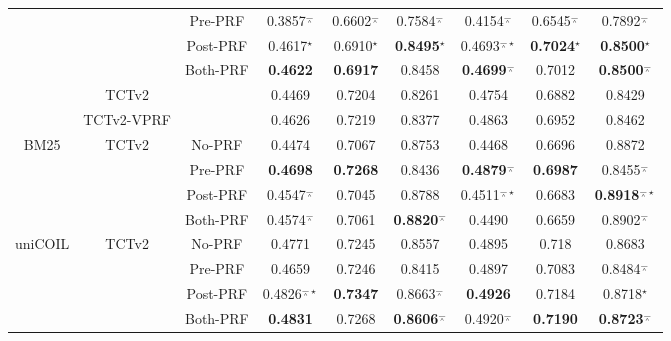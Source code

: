 \begin{table*}[]
{\begin{tabular}{ccc|ccc|ccc}
			&&Pre-PRF   &0.3857${^\barwedge}$ & 0.6602${^\barwedge}$   & 0.7584${^\barwedge}$ &  0.4154${^\barwedge}$& 0.6545${^\barwedge}$ &0.7892${^\barwedge}$         \\
			&&Post-PRF   & 0.4617${^\star}$ &  0.6910${^\star}$   &    \textbf{0.8495}${^\star}$   &    0.4693${^{\barwedge\star}}$  & \textbf{0.7024}${^\star}$  & \textbf{0.8500}${^\star}$  \\
			&&Both-PRF  &   \textbf{0.4622} & \textbf{0.6917}  &   0.8458 &    \textbf{0.4699}${^\barwedge}$ & 0.7012 &   \textbf{0.8500}${^\barwedge}$ \\
			\midrule\midrule
			&TCTv2&                   &        0.4469        &      0.7204      &        0.8261        &            0.4754             &        0.6882        &                0.8429                 \\
			&TCTv2-VPRF&               &        0.4626        &      0.7219      &        0.8377        &            0.4863             &        0.6952        &                0.8462                 \\\midrule
			\multirow{4}{*}{{BM25}}&\multirow{4}{*}{{TCTv2}}&No-PRF              &        0.4474        &      0.7067      &        0.8753        &            0.4468             &        0.6696        &                0.8872                 \\
			&&Pre-PRF        &   \textbf{0.4698}    & \textbf{0.7268}  &        0.8436        & \textbf{0.4879}${^\barwedge}$ &  \textbf{0.6987}   &         0.8455${^\barwedge}$          \\
			&&Post-PRF        & 0.4547${^\barwedge}$ &      0.7045      &        0.8788        &  0.4511${^{\barwedge\star}}$  &        0.6683        & \textbf{0.8918}${^{\barwedge\star}}$ \\
			&&Both-PRF &        0.4574${^\barwedge}$        &      0.7061      &   \textbf{0.8820}${^\barwedge}$   &            0.4490             &        0.6659        &                0.8902${^\barwedge}$                \\\midrule
			\multirow{4}{*}{{uniCOIL}}&\multirow{4}{*}{{TCTv2}}&No-PRF  & 0.4771&0.7245&0.8557&0.4895&0.718&0.8683    \\
			&&Pre-PRF  & 0.4659&0.7246&0.8415&0.4897&0.7083&0.8484${^\barwedge}$         \\
			&&Post-PRF  & 0.4826${^{\barwedge\star}}$& \textbf{0.7347} & 0.8663${^\barwedge}$& \textbf{0.4926} & 0.7184&0.8718${^\star}$\\
			&&Both-PRF & \textbf{0.4831} & 0.7268 & \textbf{0.8606}${^\barwedge}$ & 0.4920${^\barwedge}$ & \textbf{0.7190} & \textbf{0.8723}${^\barwedge}$ \\

\end{tabular}}
\end{table*}
